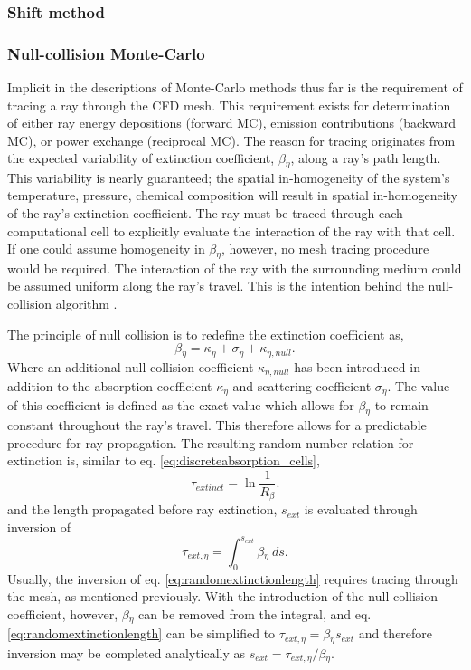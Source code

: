 \subsubsection{Shift method}


\subsubsection{Null-collision Monte-Carlo}
Implicit in the descriptions of Monte-Carlo methods thus far is the requirement of tracing a ray through the CFD mesh.
This requirement exists for determination of either ray energy depositions (forward MC), emission contributions (backward MC), or power exchange (reciprocal MC). 
The reason for tracing originates from the expected variability of extinction coefficient, $\beta{}_\eta{}$, along a ray's path length. 
This variability is nearly guaranteed; the spatial in-homogeneity of the system's temperature, pressure, chemical composition will result in spatial in-homogeneity of the ray's extinction coefficient. 
The ray must be traced through each computational cell to explicitly evaluate the interaction of the ray with that cell.
If one could assume homogeneity in $\beta{}_\eta{}$, however, no mesh tracing procedure would be required. The interaction of the ray with the surrounding medium could be assumed uniform along the ray's travel.
This is the intention behind the null-collision algorithm \cite{Galtier2013IntegralAlgorithms,Eymet2013Null-collisionSimulators}.

The principle of null collision is to redefine the extinction coefficient as,
\begin{equation}
    \beta{}_\eta{} = \kappa{}_\eta{}+\sigma{}_\eta+\kappa{}_{\eta{},null}.
    \label{eq:null_coll_absco}
\end{equation}
Where an additional null-collision coefficient $\kappa{}_{\eta,null}$ has been introduced in addition to the absorption coefficient $\kappa{}_\eta$ and scattering coefficient $\sigma{}_\eta{}$. 
The value of this coefficient is defined as the exact value which allows for $\beta{}_\eta{}$ to remain constant throughout the ray's travel.
This therefore allows for a predictable procedure for ray propagation. The resulting random number relation for extinction is, similar to eq. \ref{eq:discreteabsorption_cells},
\begin{equation}
    \tau_{extinct} = \ln{\frac{1}{R_\beta{}}}.
    \label{eq:discreteabsorption_cells_repeated}
\end{equation}
and the length propagated before ray extinction, $s_{ext}$ is evaluated through inversion of
\begin{equation}
    \tau_{ext,\eta{}} = \int_0^{s_{ext}}{\beta{}_\eta{}~ds}.
    \label{eq:randomextinctionlength}
\end{equation}
Usually, the inversion of eq. \ref{eq:randomextinctionlength} requires tracing through the mesh, as mentioned previously. With the introduction of the null-collision coefficient, however, $\beta{}_\eta{}$ can be removed from the integral, and eq. \ref{eq:randomextinctionlength} can be simplified to $\tau{}_{ext,\eta}=\beta{}_\eta{}s_{ext}$ and therefore inversion may be completed analytically as $s_{ext}=\tau{}_{ext,\eta}/\beta{}_\eta{}$.

